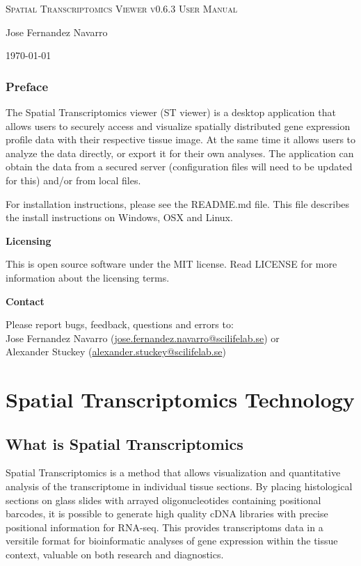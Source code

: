 \documentclass[10pt,a4paper,titlepage]{book}
\begin{document}
\begin{titlepage}
	\centering
	{\scshape\LARGE Spatial Transcriptomics Viewer v0.6.3 User Manual\par}
	\vspace{1cm}
	{\Large Jose Fernandez Navarro\par}
	\vspace{1cm}
	{\today\par}

\end{titlepage}


\subsection*{Preface}
The Spatial Transcriptomics viewer (ST viewer) is a desktop application that allows users to securely access and visualize spatially distributed gene expression profile data with their respective tissue image. At the same time it allows users to analyze the data directly, or export it for their own analyses. The application can obtain the data from a secured server (configuration files will need to be updated for this) and/or from local files.


For installation instructions, please see the README.md file. This file describes the install instructions on Windows, OSX and Linux.

{\textbf{Licensing}}

This is open source software under the MIT license.
Read LICENSE for more information about the licensing terms.

{\textbf{Contact}}

Please report bugs, feedback, questions and errors to:\\
Jose Fernandez Navarro (\href{mailto:jose.fernandez.navarro@scilifelab.se}{jose.fernandez.navarro@scilifelab.se}) or\\
Alexander Stuckey (\href{mailto:alexander.stuckey@scilifelab.se}{alexander.stuckey@scilifelab.se})



\tableofcontents
\raggedbottom
\clearpage
\listoffigures
{}

\chapter{Spatial Transcriptomics Technology}
\label{ch:st_tech}
\section{What is Spatial Transcriptomics}
Spatial Transcriptomics is a method that allows  visualization and quantitative analysis of the transcriptome in individual tissue sections. By placing histological sections on glass slides with arrayed oligonucleotides containing positional barcodes, it is possible to generate high quality cDNA libraries with precise positional information for RNA-seq. This provides transcriptoms data in a versitile format for bioinformatic analyses of gene expression within the tissue context, valuable on both research and diagnostics.
\end{document}
